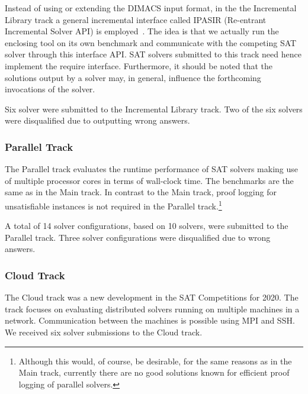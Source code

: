 \documentclass{elsarticle}
\begin{document}
Instead of using or extending the DIMACS input format, in the the Incremental Library track
a general incremental interface called IPASIR (Re-entrant Incremental Solver API) 
is employed~\cite{Balyo:2015:SATRace}. The idea is that we actually run the 
enclosing tool on its own benchmark and communicate with the competing SAT solver 
through this interface API. 
%
SAT solvers submitted to this track need hence implement the require interface.
Furthermore, it should be noted that the solutions output by a solver may, in general, influence
the forthcoming invocations of the solver.

Six solver were submitted to the Incremental Library track.
Two of the six solvers were disqualified due to outputting wrong answers.

\subsubsection{Parallel Track}

The Parallel track evaluates the runtime performance of SAT solvers making use of multiple processor cores
in terms of wall-clock time.
The benchmarks %
are the same as in the Main track. 
In contrast to the Main track, proof logging for unsatisfiable instances is not required in the Parallel track.\footnote{
Although this would, of course, be desirable, for the same reasons as in the Main track, 
currently there are no good solutions known for efficient proof logging of parallel solvers.}

A total of 14 solver configurations, based on 10 solvers, were submitted to the Parallel track.
Three solver configurations were disqualified due to wrong answers.


\subsubsection{Cloud Track}


The Cloud track was a new development in the SAT Competitions for 2020.
The track focuses on  evaluating distributed solvers running on multiple machines in a network. 
Communication between the machines is possible using MPI and SSH.
We received six solver submissions to the Cloud track.
\end{document}
